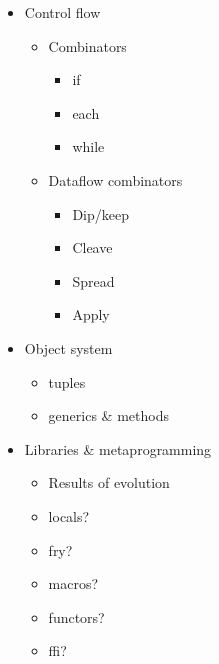 \begin{itemize}
\item Control flow
      \begin{itemize}
        \item Combinators
              \begin{itemize}
                \item if
                \item each
                \item while
              \end{itemize}
        \item Dataflow combinators
              \begin{itemize}
                \item Dip/keep
                \item Cleave
                \item Spread
                \item Apply
              \end{itemize}
      \end{itemize}

\item Object system
      \begin{itemize}
        \item tuples
        \item generics \& methods
      \end{itemize}

\item Libraries \& metaprogramming
      \begin{itemize}
        \item Results of evolution
        \item locals?
        \item fry?
        \item macros?
        \item functors?
        \item ffi?
      \end{itemize}

\end{itemize}


